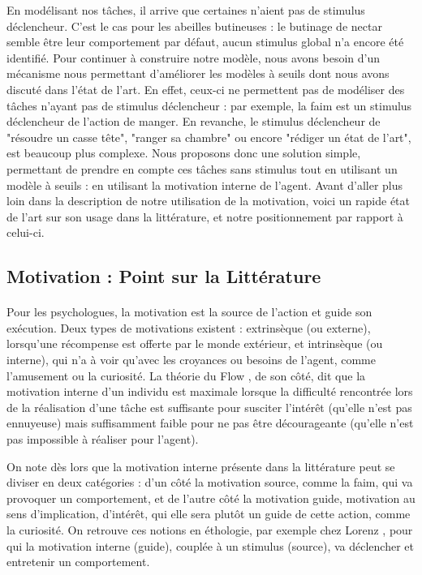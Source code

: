 En modélisant nos tâches, il arrive que certaines n'aient pas de stimulus déclencheur. C'est le cas pour les abeilles butineuses : le butinage de nectar semble être leur comportement par défaut, aucun stimulus global n'a encore été identifié. Pour continuer à construire notre modèle, nous avons besoin d'un mécanisme nous permettant d'améliorer les modèles à seuils dont nous avons discuté dans l'état de l'art. En effet, ceux-ci ne permettent pas de modéliser des tâches n'ayant pas de stimulus déclencheur : par exemple, la faim est un stimulus déclencheur de l'action de manger. En revanche, le stimulus déclencheur de "résoudre un casse tête", "ranger sa chambre" ou encore "rédiger un état de l'art", est beaucoup plus complexe. Nous proposons donc une solution simple, permettant de prendre en compte ces tâches sans stimulus tout en utilisant un modèle à seuils : en utilisant la motivation interne de l'agent. Avant d'aller plus loin dans la description de notre utilisation de la motivation, voici un rapide état de l'art sur son usage dans la littérature, et notre positionnement par rapport à celui-ci.
	
	\subsection{Motivation : Point sur la Littérature}

\paragraph{}
Pour les psychologues, la motivation est la source de l'action et guide son exécution. Deux types de motivations existent : extrinsèque (ou externe), lorsqu'une récompense est offerte par le monde extérieur, et intrinsèque (ou interne), qui n'a à voir qu'avec les croyances ou besoins de l'agent, comme l'amusement ou la curiosité. La théorie du Flow \cite{csikszentmihalyi_finding_1997}, de son côté, dit que la motivation interne d'un individu est maximale lorsque la difficulté rencontrée lors de la réalisation d'une tâche est suffisante pour susciter l'intérêt (qu'elle n'est pas ennuyeuse) mais suffisamment faible pour ne pas être décourageante (qu'elle n'est pas impossible à réaliser pour l'agent). 

On note dès lors que la motivation interne présente dans la littérature peut se diviser en deux catégories : d'un côté la motivation source, comme la faim, qui va provoquer un comportement, et de l'autre côté la motivation guide, motivation au sens d'implication, d'intérêt, qui elle sera plutôt un guide de cette action, comme la curiosité. On retrouve ces notions en éthologie, par exemple chez Lorenz \cite{lorenz_les_1984}, pour qui la motivation interne (guide), couplée à un stimulus (source), va déclencher et entretenir un comportement.
        

